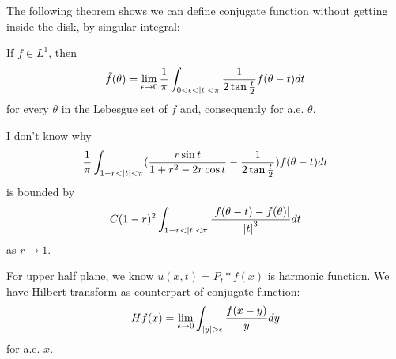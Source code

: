 The following theorem shows we can define conjugate function without getting inside the disk, by singular integral:
\begin{theorem}
    If $f\in L^1$, then
    \begin{equation*}
        \tilde{f}(\theta)=\lim_{\epsilon\to 0}\frac{1}{\pi}\int_{0<\epsilon<\left\lvert t\right\rvert<\pi}\frac{1}{2\tan{\frac{t}{2}}}f(\theta-t)d t
    \end{equation*}
    for every $\theta$ in the Lebesgue set of $f$ and, consequently for a.e. $\theta$.
\end{theorem}
\begin{remark}
    {\color{blue}I don't know why
        \begin{equation*}
            \frac{1}{\pi}\int_{1-r<\left\lvert t\right\rvert<\pi}(\frac{r\sin{t}}{1+r^2-2r\cos{t}}-\frac{1}{2\tan{\frac{t}{2}}})f(\theta-t)d t
        \end{equation*}
        is bounded by
        \begin{equation*}
            C(1-r)^2\int_{1-r<\left\lvert t\right\rvert<\pi}\frac{\left\lvert f(\theta-t)-f(\theta)\right\rvert}{\left\lvert t\right\rvert^3}d t
        \end{equation*}
        as $r\to 1$}.
\end{remark}
For upper half plane, we know $u(x,t)=P_t*f(x)$ is harmonic function. We have Hilbert transform as counterpart of conjugate function:
\begin{equation*}
    H f(x)=\lim_{\epsilon\to 0}\int_{\left\lvert y\right\rvert>\epsilon}\frac{f(x-y)}{y}d y
\end{equation*}
for a.e. $x$.
% 
